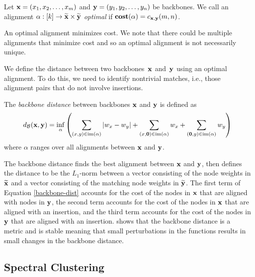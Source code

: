 \begin{defn}
    Let $\textbf{x}=(x_1, x_2, \dots, x_m)$ and $\textbf{y}=(y_1, y_2, \dots, y_n)$ be
    backbones. We call an alignment $\alpha:[k] \rightarrow \widetilde{\textbf{x}} \times
    \widetilde{\textbf{y}}$ \emph{optimal} if $\textbf{cost}(\alpha)=c_{\textbf{x}, \textbf{y}}(m,n)$.
    \label{def:optimal-cost}
\end{defn}

An optimal alignment minimizes cost. We note that there could be multiple
alignments that minimize cost and so an optimal alignment is not necessarily
unique. 

We define the distance between two backbones~$\textbf{x}$ and~$\textbf{y}$ using an
optimal alignment. To do this, we need to identify nontrivial matches, i.e.,
those alignment pairs that do not involve insertions.

\begin{defn}\label{def:backbone-dist}
    The \emph{backbone distance} between backbones $\textbf{x}$ and $\textbf{y}$ is defined
    as
    \begin{equation}\label{backbone-dist}
    d_{\mathcal{B}}(\textbf{x}, \textbf{y}) = \inf_{\alpha}
        \left (\sum_{(x,y) \in \operatorname{im}(\alpha)} |w_x - w_y|
        + \sum_{(x,{\mathbf{0}}) \in \operatorname{im}(\alpha)} w_x
        + \sum_{({\mathbf{0}},y) \in \operatorname{im}(\alpha)} w_y \right )
    \end{equation}
    where $\alpha$ ranges over all alignments between $\textbf{x}$ and $\textbf{y}$.
\end{defn}

The backbone distance finds the best alignment between $\textbf{x}$ and $\textbf{y}$, then
defines  the distance to be the $L_1$-norm between a vector consisting of the
node weights in $\widetilde{\textbf{x}}$ and a vector consisting of the matching node weights
in $\widetilde{\textbf{y}}$. The first term of Equation \ref{backbone-dist} accounts for the
cost of the nodes in $\textbf{x}$ that are aligned with nodes in $\textbf{y}$, the second term
accounts for the cost of the nodes in $\textbf{x}$ that are aligned with an insertion,
and the third term accounts for the cost of the nodes in $\textbf{y}$ that are aligned
with an insertion.  shows that the backbone distance is a metric and is stable 
meaning that small perturbations in the functions results in small changes in the backbone distance. 

\subsection{Spectral Clustering}
\todo{}